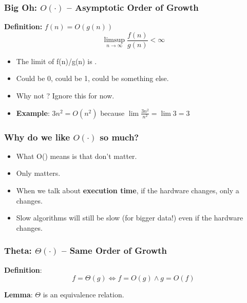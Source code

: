 \documentclass{beamer}
\begin{document}
\begin{frame}
  \frametitle{Big Oh: $O(\cdot)$ -- Asymptotic Order of Growth}

  {\larger
    {\bf Definition:} $f(n) = O(g(n))$
    \begin{equation}
      \limsup_{n\to\infty}\frac{f(n)}{g(n)} < \infty
    \end{equation}

    \vfill
    
    \begin{itemize}
    \item The limit of f(n)/g(n) is .
    \item Could be 0, could be 1, could be something else.
    \item Why  not ? Ignore this for now.

      \bigskip

    \item {\bf Example}: $3n^2 = O(n^2)$ because $\lim\frac{3n^2}{n^2} = \lim3 = 3$
    \end{itemize}
    
  }
\end{frame}

\begin{frame}
  \frametitle{Why do we like $O(\cdot)$ so much?}

  {\larger
    \begin{itemize}
    \item What O() means is that  don't matter.
    \item Only  matters.

      \bigskip

    \item When we talk about {\bf execution time}, if the hardware changes,
      only a  changes.

      \bigskip
      
    \item Slow algorithms will still be slow (for bigger data!) even if
      the hardware changes.
    \end{itemize}
    
  }
\end{frame}

\begin{frame}
  \frametitle{Theta: $\Theta(\cdot)$ -- Same Order of Growth}

  {\larger

    {\bf Definition}:
    \begin{equation}
      f = \Theta(g) \iff f = O(g) \land g = O(f)
    \end{equation}

    \bigskip

    {\bf Lemma}: $\Theta$ is an equivalence relation.
  }
  
\end{frame}
\end{document}

